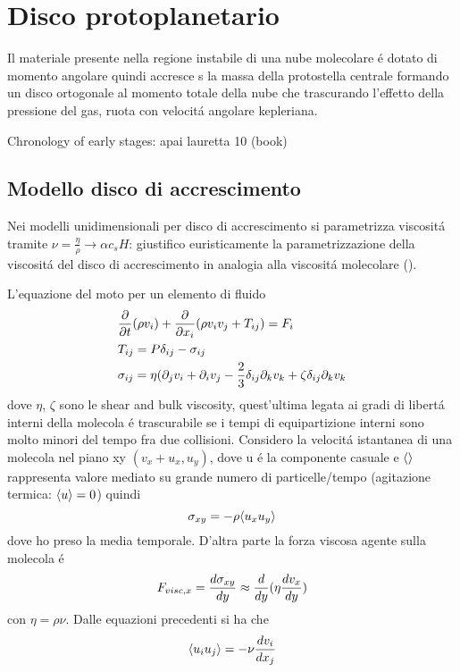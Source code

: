 {\let\clearpage\relax\let\cleardoublepage\relax
\chapter{Disco protoplanetario}
}

Il materiale presente nella regione instabile di una nube molecolare \'e dotato di momento angolare quindi accresce s la massa della protostella centrale formando un disco ortogonale al momento totale della nube che trascurando l'effetto della pressione del gas, ruota con velocit\'a angolare kepleriana.

\begin{workout}
Chronology of  early stages: apai lauretta 10 (book)
\end{workout}

\section{Modello disco di accrescimento}

Nei modelli unidimensionali per disco di accrescimento si parametrizza viscosit\'a tramite $\nu=\frac{\eta}{\rho}\to\alpha c_s H$: giustifico euristicamente la parametrizzazione della viscosit\'a del disco di accrescimento in analogia alla viscosit\'a molecolare (\cite{bouvier2002theory}).

L'equazione del moto per un elemento di fluido
\begin{align}
&\PDof{t}(\rho v_i)+\PDof{x_i}(\rho v_iv_j+T_{ij})=F_i\\
&T_{ij}=P\delta_{ij}-\sigma_{ij}\\
&\sigma_{ij}=\eta(\partial_jv_i+\partial_iv_j-\frac{2}{3}\delta_{ij}\partial_kv_k+\zeta\delta_{ij}\partial_kv_k
\end{align}
dove $\eta$, $\zeta$ sono le shear and bulk viscosity, quest'ultima legata ai gradi di libert\'a interni della molecola \'e trascurabile se i tempi di equipartizione interni sono molto minori del tempo fra due collisioni.
Considero la velocit\'a istantanea di una molecola nel piano xy $(v_x+u_x,u_y)$, dove u \'e la componente casuale e $\exv{}$ rappresenta valore mediato su grande numero di particelle/tempo (agitazione termica: $\exv{u}=0$) quindi
\begin{equation}
\sigma_{xy}=-\rho\exv{u_xu_y}
\end{equation}
dove ho preso la media temporale.
D'altra parte la forza viscosa agente sulla molecola \'e
\begin{equation}
F_{visc,x}=\TDy{y}{\sigma_{xy}}\approx\TDof{y}(\eta\TDy{y}{v_x})
\end{equation}
con $\eta=\rho\nu$.
Dalle equazioni precedenti si ha che
\begin{equation}
\exv{u_iu_j}=-\nu\TDy{x_j}{v_i}
\end{equation}

